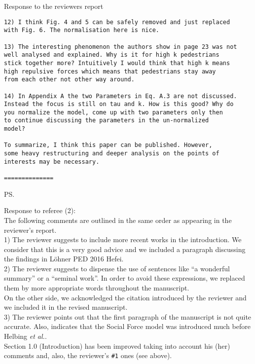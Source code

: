 \documentclass[a4paper,12pt]{letter}
\begin{document}
\begin{letter}{Response to the reviewers report}
\begin{verbatim}
12) I think Fig. 4 and 5 can be safely removed and just replaced 
with Fig. 6. The normalisation here is nice.

13) The interesting phenomenon the authors show in page 23 was not 
well analysed and explained. Why is it for high k pedestrians 
stick together more? Intuitively I would think that high k means 
high repulsive forces which means that pedestrians stay away 
from each other not other way around.

14) In Appendix A the two Parameters in Eq. A.3 are not discussed. 
Instead the focus is still on tau and k. How is this good? Why do 
you normalize the model, come up with two parameters only then 
to continue discussing the parameters in the un-normalized 
model?

To summarize, I think this paper can be published. However, 
some heavy restructuring and deeper analysis on the points of 
interests may be necessary. 

==============

\end{verbatim}


\ps{Response to referee (2): \\

The following comments are outlined in the same order as appearing in the
reviewer’s report. \\

1) The reviewer suggests to include more recent works in the introduction. We consider that this
is a very good advice and we included a paragraph discussing the findings in L\"ohner PED 2016 Hefei. \\

2) The reviewer suggests to dispense the use of sentences like ``a wonderful 
summary'' or a ``seminal work''. In order to avoid these expressions, we 
replaced them by more appropriate words throughout the manuscript. \\

On the other side, we acknowledged the citation introduced by the reviewer and 
we included it in the revised manuscript. \\

3) The reviewer points out that the first paragraph of the manuscript is not 
quite accurate. Also, indicates that the Social Force model was introduced much 
before Helbing \textit{et al.}. \\

Section 1.0 (Introduction) has been improved taking into account his (her) 
comments and, also, the reviewer's \verb?#1? ones (see above). 

}
\end{letter}
\end{document}
